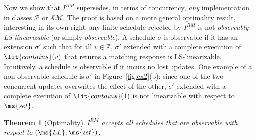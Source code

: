 \documentclass[11pt,pdftex,letterpaper]{article}
\newtheorem{theorem}{Theorem}
\begin{document}
Now we show that $I^{RM}$ supersedes, in terms of concurrency, \emph{any} implementation in classes
$\mathcal{P}$ or $\mathcal{SM}$.
The proof is based on a more general optimality result, interesting in its own right: 
any finite schedule rejected by $I^{RM}$ is not \emph{observably
LS-linearizable} (or simply \emph{observable}). 
A schedule $\sigma$ is observable 
if it has an extension $\sigma'$ such that for all $v\in \mathbb{Z}$, 
$\sigma'$ extended with a complete execution of $\lit{contains}(v)$ that returns a matching response is LS-linearizable. 
Intuitively, a schedule is observable if it incurs no lost updates.
One example of a non-observable schedule is $\sigma'$ in
Figure~\ref{fig:ex2}(b): since one of the two concurrent
updates overwrites the effect of the other, $\sigma'$ extended with a
complete execution of $\lit{contains}(1)$ 
is not linearizable with respect to $\ms{set}$.
\begin{theorem}[Optimality]
\label{th:lrelaxed}
$I^{RM}$ accepts all schedules that are observable with respect to $(\ms{LL},\ms{set})$.
\end{theorem}
\end{document}
